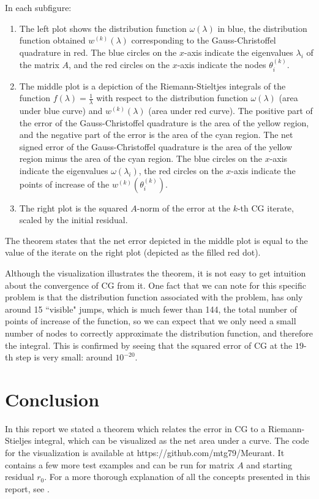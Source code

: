 \documentclass[10pt,a4paper]{article}
\begin{document}
In each subfigure:
\begin{enumerate}
\item The left plot shows the distribution function $\omega(\lambda)$ in blue, the distribution function obtained  $w^{(k)}(\lambda)$ corresponding to the Gauss-Christoffel quadrature in red. The blue circles on the $x$-axis indicate the eigenvalues $\lambda_i$ of the matrix $A$, and the red circles on the $x$-axis indicate the nodes $\theta_i^{(k)}$.
\item The middle plot is a depiction of the Riemann-Stieltjes integrals of the function $f(\lambda) = \frac{1}{\lambda} $ with respect to the distribution function $\omega(\lambda)$ (area under blue curve) and $w^{(k)}(\lambda)$ (area under red curve). The positive part of the error of the Gauss-Christoffel quadrature is the area of the yellow region, and the negative part of the error is the area of the cyan region. The net signed error of the Gauss-Christoffel quadrature is the area of the yellow region minus the area of the cyan region. The blue circles on the $x$-axis indicate the eigenvalues $\omega(\lambda_i)$, the red circles on the $x$-axis indicate the points of increase of the $w^{(k)}(\theta_i^{(k)})$.
\item The right plot is the squared $A$-norm of the error at the $k$-th CG iterate, scaled by the initial residual.
\end{enumerate}
The theorem states that the net error depicted in the middle plot is equal to the value of the iterate on the right plot (depicted as the filled red dot). 

Although the visualization illustrates the theorem, it is not easy to get intuition about the convergence of CG from it. One fact that we can note for this specific problem is that the distribution function associated with the problem, has only around 15 ``visible" jumps, which is much fewer than 144, the total number of points of increase of the function, so we can expect that we only need a small number of nodes to correctly approximate the distribution function, and therefore the integral. This is confirmed by seeing that the squared error of CG at the $19$-th step is very small: around $10^{-20} $. 



\section{Conclusion}

In this report we stated a theorem which relates the error in CG to a Riemann-Stieljes integral, which can be visualized as the net area under a curve. The code for the visualization is available at https://github.com/mtg79/Meurant. It contains a few more test examples and can be run for matrix $A$ and starting residual $r_0$. For a more thorough explanation of all the concepts presented in this report, see \cite{liesen_strakoss_zdenek_2013}.

\printbibliography
\end{document}
